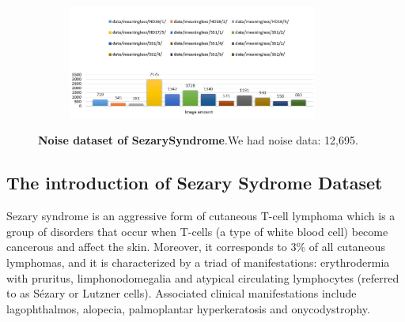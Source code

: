 \begin{figure}[h]
	\begin{center}
		\begin{subfigure}[b]{\textwidth}
		    \centering
			\includegraphics[width=0.9\textwidth]{thesis-template-master/images/noiseofSezarySyndrome.JPG}
			\label{fig:cellnet}
		\end{subfigure}
	\end{center}
	\caption{\textbf{Noise dataset of SezarySyndrome}.We had noise data: 12,695.}
\end{figure}

\subsection{The introduction of Sezary Sydrome Dataset}
Sezary syndrome is an aggressive form of cutaneous T-cell lymphoma which is a group of disorders that occur when T-cells (a type of white blood cell) become cancerous and affect the skin\cite{Alain}. Moreover, it corresponds to 3\% of all cutaneous lymphomas, and it is characterized by a triad of manifestations: erythrodermia with pruritus, limphonodomegalia and atypical circulating lymphocytes (referred to as Sézary or Lutzner cells). Associated clinical manifestations include lagophthalmos, alopecia, palmoplantar hyperkeratosis and onycodystrophy.\cite{Yamashita}



